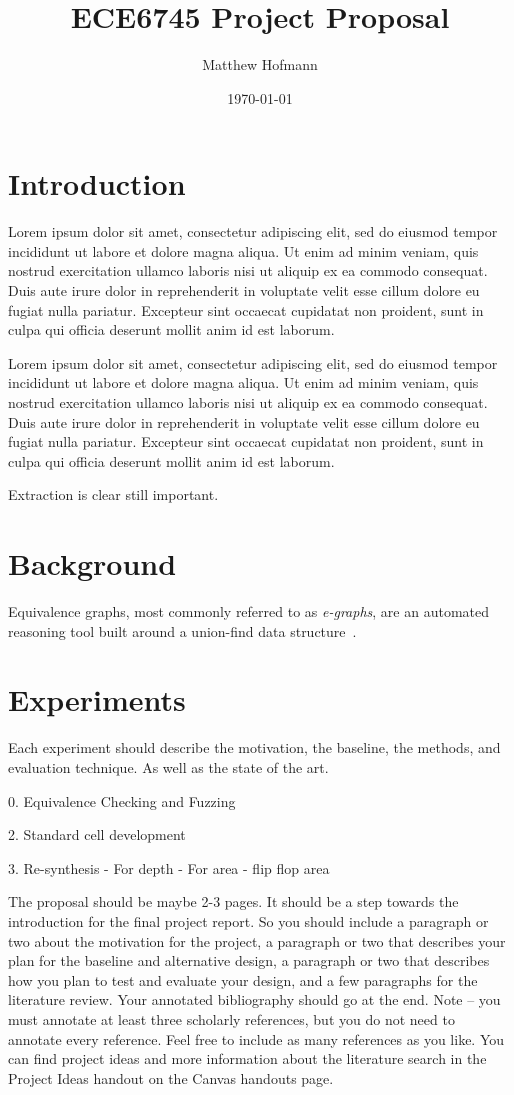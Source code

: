 \documentclass[10pt,letterpaper]{article}
\title{ECE6745 Project Proposal}
\author{Matthew Hofmann}
\date{\today}
\begin{document}
\maketitle

\section{Introduction}\label{sec:intro}
Lorem ipsum dolor sit amet, consectetur adipiscing elit, sed do eiusmod tempor
incididunt ut labore et dolore magna aliqua. Ut enim ad minim veniam, quis
nostrud exercitation ullamco laboris nisi ut aliquip ex ea commodo consequat.
Duis aute irure dolor in reprehenderit in voluptate velit esse cillum dolore eu
fugiat nulla pariatur. Excepteur sint occaecat cupidatat non proident, sunt in
culpa qui officia deserunt mollit anim id est laborum.

Lorem ipsum dolor sit amet, consectetur adipiscing elit, sed do eiusmod tempor
incididunt ut labore et dolore magna aliqua. Ut enim ad minim veniam, quis
nostrud exercitation ullamco laboris nisi ut aliquip ex ea commodo consequat.
Duis aute irure dolor in reprehenderit in voluptate velit esse cillum dolore eu
fugiat nulla pariatur. Excepteur sint occaecat cupidatat non proident, sunt in
culpa qui officia deserunt mollit anim id est laborum.

Extraction is clear still important.

\section{Background}\label{sec:background}
Equivalence graphs, most commonly referred to as \textit{e-graphs}, are an
automated reasoning tool built around a union-find data
structure~\cite{eggpaper}.

\section{Experiments}\label{sec:experiments}

Each experiment should describe the motivation, the baseline, the methods, and
evaluation technique. As well as the state of the art.

0. Equivalence Checking and Fuzzing

2. Standard cell development

3. Re-synthesis
- For depth
- For area
- flip flop area

The proposal should be maybe 2-3 pages. It should be a step towards the
introduction for the final project report. So you should include a paragraph or
two about the motivation for the project, a paragraph or two that describes
your plan for the baseline and alternative design, a paragraph or two that
describes how you plan to test and evaluate your design, and a few paragraphs
for the literature review. Your annotated bibliography should go at the end.
Note -- you must annotate at least three scholarly references, but you do not
need to annotate every reference. Feel free to include as many references as
you like. You can find project ideas and more information about the literature
search in the Project Ideas handout on the Canvas handouts page.



\end{document}

